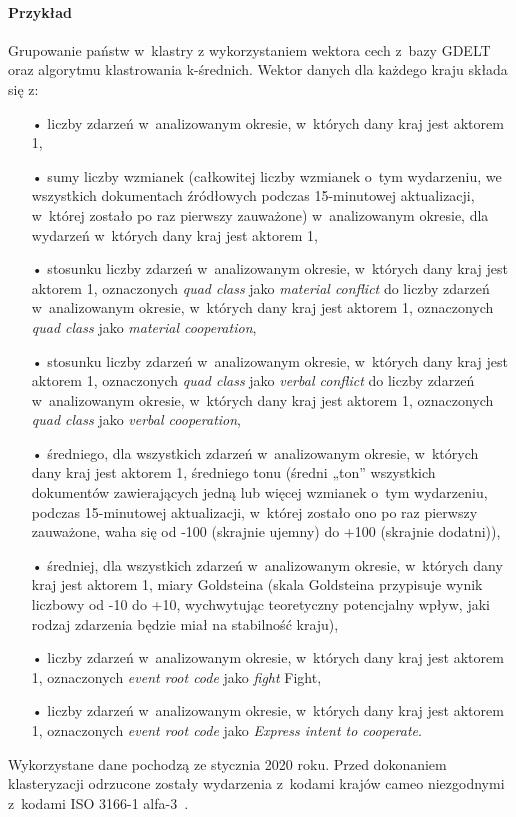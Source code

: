 \documentclass[11pt]{report}
\begin{document}
    \paragraph{Przykład}

    Grupowanie państw w~klastry z wykorzystaniem wektora cech z~bazy GDELT oraz algorytmu klastrowania k-średnich.
    Wektor danych dla każdego kraju składa się z:
    \begin{enumerate}
        \item[•] liczby zdarzeń w~analizowanym okresie, w~których dany kraj jest aktorem 1,
        \item[•] sumy liczby wzmianek (całkowitej liczby wzmianek o~tym wydarzeniu, we wszystkich dokumentach źródłowych podczas 15-minutowej aktualizacji, w~której zostało po raz pierwszy zauważone) w~analizowanym okresie, dla wydarzeń w~których dany kraj jest aktorem 1,
        \item[•] stosunku liczby zdarzeń w~analizowanym okresie, w~których dany kraj jest aktorem 1, oznaczonych \textit{quad class} jako \textit{material conflict} do liczby zdarzeń w~analizowanym okresie, w~których dany kraj jest aktorem 1, oznaczonych \textit{quad class} jako \textit{material cooperation},
        \item[•] stosunku liczby zdarzeń w~analizowanym okresie, w~których dany kraj jest aktorem 1, oznaczonych \textit{quad class} jako \textit{verbal conflict} do liczby zdarzeń w~analizowanym okresie, w~których dany kraj jest aktorem 1, oznaczonych \textit{quad class} jako \textit{verbal cooperation},
        \item[•] średniego, dla wszystkich zdarzeń w~analizowanym okresie, w~których dany kraj jest aktorem 1, średniego tonu (średni „ton” wszystkich dokumentów zawierających jedną lub więcej wzmianek o~tym wydarzeniu, podczas 15-minutowej aktualizacji, w~której zostało ono po raz pierwszy zauważone, waha się od -100 (skrajnie ujemny) do +100 (skrajnie dodatni)),
        \item[•] średniej, dla wszystkich zdarzeń w~analizowanym okresie, w~których dany kraj jest aktorem 1, miary Goldsteina (skala Goldsteina przypisuje wynik liczbowy od -10 do +10, wychwytując teoretyczny potencjalny wpływ, jaki rodzaj zdarzenia będzie miał na stabilność kraju),
        \item[•] liczby zdarzeń w~analizowanym okresie, w~których dany kraj jest aktorem 1, oznaczonych \textit{event root code} jako \textit{fight} Fight,
        \item[•] liczby zdarzeń w~analizowanym okresie, w~których dany kraj jest aktorem 1, oznaczonych \textit{event root code} jako \textit{Express intent to cooperate}.
    \end{enumerate}
    Wykorzystane dane pochodzą ze stycznia 2020 roku.
    Przed dokonaniem klasteryzacji odrzucone zostały wydarzenia z~kodami krajów cameo niezgodnymi z~kodami ISO 3166-1 alfa-3~\cite{iso_alfa3}.
\end{document}
